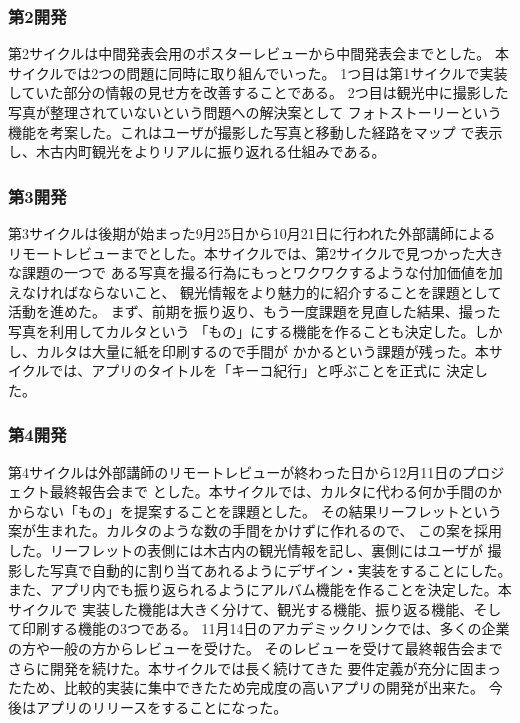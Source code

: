 \documentclass[twocolumn,draft]{jsarticle}
\begin{document}
\subsubsection{第2開発}
\begin{hissu}
第2サイクルは中間発表会用のポスターレビューから中間発表会までとした。
本サイクルでは2つの問題に同時に取り組んでいった。
1つ目は第1サイクルで実装していた部分の情報の見せ方を改善することである。
2つ目は観光中に撮影した写真が整理されていないという問題への解決案として
フォトストーリーという機能を考案した。これはユーザが撮影した写真と移動した経路をマップ
で表示し、木古内町観光をよりリアルに振り返れる仕組みである。
\end{hissu}
\subsubsection{第3開発}
\begin{hissu}
第3サイクルは後期が始まった9月25日から10月21日に行われた外部講師による
リモートレビューまでとした。本サイクルでは、第2サイクルで見つかった大きな課題の一つで
ある写真を撮る行為にもっとワクワクするような付加価値を加えなければならないこと、
観光情報をより魅力的に紹介することを課題として活動を進めた。
まず、前期を振り返り、もう一度課題を見直した結果、撮った写真を利用してカルタという
「もの」にする機能を作ることも決定した。しかし、カルタは大量に紙を印刷するので手間が
かかるという課題が残った。本サイクルでは、アプリのタイトルを「キーコ紀行」と呼ぶことを正式に
決定した。
\end{hissu}


\subsubsection{第4開発}
\begin{hissu}
第4サイクルは外部講師のリモートレビューが終わった日から12月11日のプロジェクト最終報告会まで
とした。本サイクルでは、カルタに代わる何か手間のかからない「もの」を提案することを課題とした。
その結果リーフレットという案が生まれた。カルタのような数の手間をかけずに作れるので、
この案を採用した。リーフレットの表側には木古内の観光情報を記し、裏側にはユーザが
撮影した写真で自動的に割り当てあれるようにデザイン・実装をすることにした。
また、アプリ内でも振り返られるようにアルバム機能を作ることを決定した。本サイクルで
実装した機能は大きく分けて、観光する機能、振り返る機能、そして印刷する機能の3つである。
11月14日のアカデミックリンクでは、多くの企業の方や一般の方からレビューを受けた。
そのレビューを受けて最終報告会までさらに開発を続けた。本サイクルでは長く続けてきた
要件定義が充分に固まったため、比較的実装に集中できたため完成度の高いアプリの開発が出来た。
今後はアプリのリリースをすることになった。
\end{hissu}
\end{document}
